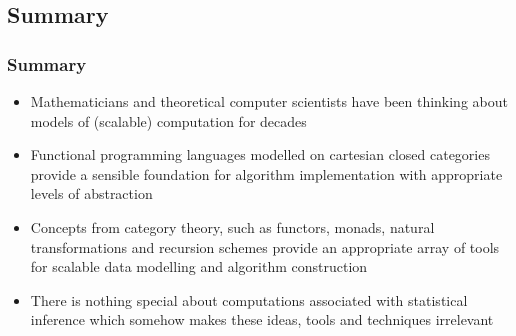 \documentclass[mathserif,handout]{beamer}
\begin{document}
\subsection{Summary}

\begin{frame}
  \frametitle{Summary}
  \begin{itemize}
  \item Mathematicians and theoretical computer scientists have been thinking about models of (scalable) computation for decades
  \item Functional programming languages modelled on cartesian closed categories provide a sensible foundation for algorithm implementation with appropriate levels of abstraction
  \item Concepts from category theory, such as functors, monads, natural transformations and recursion schemes provide an appropriate array of tools for scalable data modelling and algorithm construction
    \item There is \alert{nothing special} about computations associated with statistical inference which somehow makes these ideas, tools and techniques irrelevant
  \end{itemize}
\end{frame}

\end{document}
